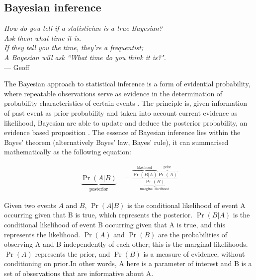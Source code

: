 \subsection{Bayesian inference}
\begin{displayquote}
	\textit{How do you tell if a statistician is a true Bayesian?} \\
	\textit{Ask them what time it is.} \\
	\textit{If they tell you the time, they’re a frequentist;}\\
	\textit{A Bayesian will ask “What time do you think it is?".} \\
	
	\hskip 5cm --- Geoff \citet{Johns2018}
\end{displayquote}

The Bayesian approach to statistical inference is a form of evidential probability, where repeatable observations serve as evidence in the determination of probability characteristics of certain events \citep{paulos2011mathematics,wheeler2011evidential}. The principle is, given information of past event as prior probability  and taken into account current evidence as likelihood, Bayesian are able to update and deduce the posterior probability, an evidence based proposition \citep{laplace1998pierre}. The essence of Bayesian inference lies within the Bayes' theorem (alternatively Bayes' law, Bayes' rule)\citep{brewer13}, it can summarised mathematically as the following equation:

\begin{equation}\label{baye1}
\begin{aligned}
\underbrace{\Pr(A | B)}_{\text{posterior}} &= \frac{\overbrace{\Pr(B | A)}^{\text{likelihood}} \overbrace{\Pr(A)}^{\text{prior}}}{\underbrace{\Pr(B)}_{\text{marginal likelihood}}}
\end{aligned}
\end{equation}

Given two events $A$ and $B$,
$\Pr(A|B)$ is the conditional likelihood of event A occurring given that  B is true, which represents the posterior. 
$\Pr(B|A)$ is the conditional likelihood of event B occurring given that  A is true, and this represents the likelihood. 
$\Pr(A)$ and $\Pr(B)$ are the probabilities of observing  A and  B independently of each other; this is the marginal likelihoods. $\Pr(A)$ represents the prior, and $\Pr(B)$ is a measure of evidence, without conditioning on prior.In other words,  A here is a parameter of interest and B is a set of observations that are informative about A. 


